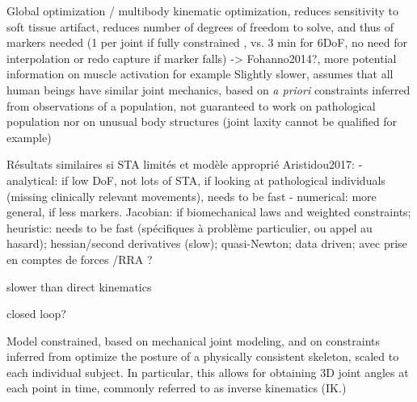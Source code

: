 


Global optimization / multibody kinematic optimization, reduces sensitivity to soft tissue artifact, reduces number of degrees of freedom to solve, and thus of markers needed (1 per joint if fully constrained \cite{Slater2018}, vs. 3 min for 6DoF, no need for interpolation or redo capture if marker falls) -> Fohanno2014?, more potential information on muscle activation for example \cite{Robinson2013,Kainz2016}
Slightly slower, assumes that all human beings have similar joint mechanics, based on \textit{a priori} constraints inferred from observations of a population, not guaranteed to work on pathological population nor on unusual body structures (joint laxity cannot be qualified for example)

Résultats similaires si STA limités et modèle approprié \cite{Kainz2016}
Aristidou2017: 
- analytical: if low DoF, not lots of STA, if looking at pathological individuals (missing  clinically relevant movements), needs to be fast
- numerical: more general, if less markers. Jacobian: if biomechanical laws and weighted constraints; heuristic: needs to be fast (spécifiques à problème particulier, ou appel au hasard); hessian/second derivatives (slow); quasi-Newton; data driven; avec prise en comptes de forces /RRA ?

slower than direct kinematics



closed loop?



Model constrained, based on mechanical joint modeling, and on constraints inferred from  
optimize the posture of a physically consistent skeleton, scaled to each individual subject. In particular, this allows for obtaining 3D joint angles at each point in time, commonly referred to as inverse kinematics (IK.)







